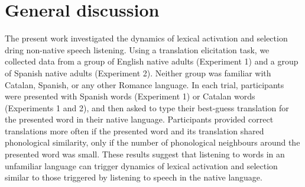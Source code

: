 \documentclass[
]{article}
\begin{document}
\section{General discussion}\label{general-discussion}

The present work investigated the dynamics of lexical activation and
selection dring non-native speech listening. Using a translation
elicitation task, we collected data from a group of English native
adults (Experiment 1) and a group of Spanish native adults (Experiment
2). Neither group was familiar with Catalan, Spanish, or any other
Romance language. In each trial, participants were presented with
Spanish words (Experiment 1) or Catalan words (Experiments 1 and 2), and
then asked to type their best-guess translation for the presented word
in their native language. Participants provided correct translations
more often if the presented word and its translation shared phonological
similarity, only if the number of phonological neighbours around the
presented word was small. These results suggest that listening to words
in an unfamiliar language can trigger dynamics of lexical activation and
selection similar to those triggered by listening to speech in the
native language.
\end{document}
